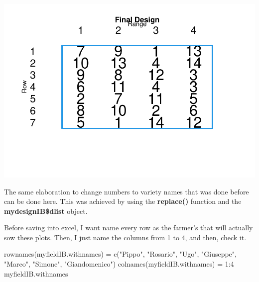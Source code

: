 \documentclass[
]{book}
\newenvironment{Shaded}{\begin{snugshade}}{\end{snugshade}}
\newcommand{\AttributeTok}[1]{\textcolor[rgb]{0.77,0.63,0.00}{#1}}
\newcommand{\CommentTok}[1]{\textcolor[rgb]{0.56,0.35,0.01}{\textit{#1}}}
\newcommand{\DecValTok}[1]{\textcolor[rgb]{0.00,0.00,0.81}{#1}}
\newcommand{\FunctionTok}[1]{\textcolor[rgb]{0.00,0.00,0.00}{#1}}
\newcommand{\NormalTok}[1]{#1}
\newcommand{\OtherTok}[1]{\textcolor[rgb]{0.56,0.35,0.01}{#1}}
\newcommand{\SpecialCharTok}[1]{\textcolor[rgb]{0.00,0.00,0.00}{#1}}
\newcommand{\StringTok}[1]{\textcolor[rgb]{0.31,0.60,0.02}{#1}}
\begin{document}
\includegraphics{PPB-Toolkit-for-R-and-R-Studio_files/figure-latex/unnamed-chunk-83-1.pdf}

The same elaboration to change numbers to variety names that was done before can be done here. This was achieved by using the \textbf{replace()} function and the \textbf{mydesignIB\$dlist} object.

\begin{Shaded}
\end{Shaded}

Before saving into excel, I want name every row as the farmer's that will actually sow these plots. Then, I just name the columns from 1 to 4, and then, check it.

\begin{Shaded}
\begin{Highlighting}[]
\FunctionTok{rownames}\NormalTok{(myfieldIB.withnames) }\OtherTok{=} \FunctionTok{c}\NormalTok{(}\StringTok{"Pippo"}\NormalTok{, }\StringTok{"Rosario"}\NormalTok{, }\StringTok{"Ugo"}\NormalTok{, }\StringTok{"Giuseppe"}\NormalTok{, }\StringTok{"Marco"}\NormalTok{, }\StringTok{"Simone"}\NormalTok{, }\StringTok{"Giandomenico"}\NormalTok{)}
\FunctionTok{colnames}\NormalTok{(myfieldIB.withnames) }\OtherTok{=} \DecValTok{1}\SpecialCharTok{:}\DecValTok{4}
\NormalTok{myfieldIB.withnames}
\end{Highlighting}
\end{Shaded}
\end{document}
